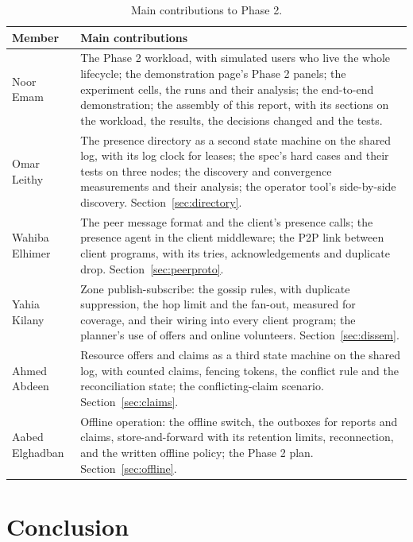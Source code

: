 \begin{table}[!htb]
\centering\small
\caption{Main contributions to Phase 2.}
\label{tab:team}
\begin{tabularx}{\linewidth}{@{}P{2.9cm}L@{}}
\toprule
Member & Main contributions \\
\midrule
Noor Emam & The Phase 2 workload, with simulated users who live the whole lifecycle; the demonstration page's Phase 2 panels; the experiment cells, the runs and their analysis; the end-to-end demonstration; the assembly of this report, with its sections on the workload, the results, the decisions changed and the tests. \\ %
Omar Leithy & The presence directory as a second state machine on the shared log, with its log clock for leases; the spec's hard cases and their tests on three nodes; the discovery and convergence measurements and their analysis; the operator tool's side-by-side discovery. Section~\ref{sec:directory}. \\ %
Wahiba Elhimer & The peer message format and the client's presence calls; the presence agent in the client middleware; the P2P link between client programs, with its tries, acknowledgements and duplicate drop. Section~\ref{sec:peerproto}. \\ %
Yahia Kilany & Zone publish-subscribe: the gossip rules, with duplicate suppression, the hop limit and the fan-out, measured for coverage, and their wiring into every client program; the planner's use of offers and online volunteers. Section~\ref{sec:dissem}. \\ %
Ahmed Abdeen & Resource offers and claims as a third state machine on the shared log, with counted claims, fencing tokens, the conflict rule and the reconciliation state; the conflicting-claim scenario. Section~\ref{sec:claims}. \\ %
Aabed Elghadban & Offline operation: the offline switch, the outboxes for reports and claims, store-and-forward with its retention limits, reconnection, and the written offline policy; the Phase 2 plan. Section~\ref{sec:offline}. \\ %
\bottomrule
\end{tabularx}
\end{table}

\section{Conclusion}

